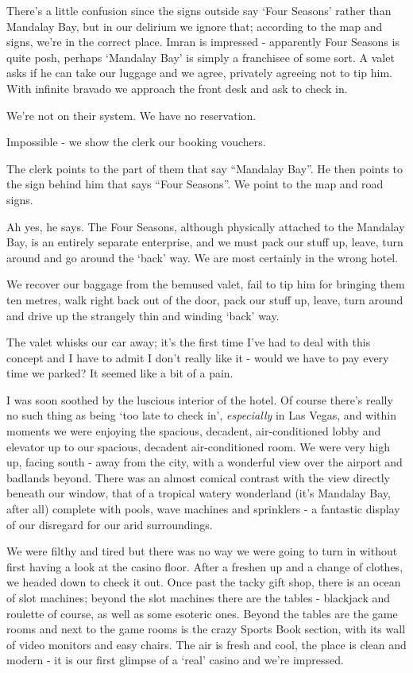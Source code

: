 \documentclass[a5paper,titlepage,draft]{book}
\begin{document}
There's a little confusion since the signs outside say `Four Seasons' rather than Mandalay Bay, but in our delirium we ignore that; according to the map and signs, we're in the correct place.  Imran is impressed - apparently Four Seasons is quite posh, perhaps `Mandalay Bay' is simply a franchisee of some sort.  A valet asks if he can take our luggage and we agree, privately agreeing not to tip him.  With infinite bravado we approach the front desk and ask to check in.

We're not on their system.  We have no reservation.

Impossible - we show the clerk our booking vouchers.

The clerk points to the part of them that say ``Mandalay Bay''.  He then points to the sign behind him that says ``Four Seasons''.  We point to the map and road signs.

Ah yes, he says.  The Four Seasons, although physically attached to the Mandalay Bay, is an entirely separate enterprise, and we must pack our stuff up, leave, turn around and go around the `back' way.  We are most certainly in the wrong hotel.

We recover our baggage from the bemused valet, fail to tip him for bringing them ten metres, walk right back out of the door, pack our stuff up, leave, turn around and drive up the strangely thin and winding `back' way.

The valet whisks our car away; it's the first time I've had to deal with this concept and I have to admit I don't really like it - would we have to pay every time we parked?  It seemed like a bit of a pain.

I was soon soothed by the luscious interior of the hotel.  Of course there's really no such thing as being `too late to check in', \emph{especially} in Las Vegas, and within moments we were enjoying the spacious, decadent, air-conditioned lobby and elevator up to our spacious, decadent air-conditioned room.  We were very high up, facing south - away from the city, with a wonderful view over the airport and badlands beyond.  There was an almost comical contrast with the view directly beneath our window, that of a tropical watery wonderland (it's Mandalay Bay, after all) complete with pools, wave machines and sprinklers - a fantastic display of our disregard for our arid surroundings.

We were filthy and tired but there was no way we were going to turn in without first having a look at the casino floor.  After a freshen up and a change of clothes, we headed down to check it out.  Once past the tacky gift shop, there is an ocean of slot machines; beyond the slot machines there are the tables - blackjack and roulette of course, as well as some esoteric ones.  Beyond the tables are the game rooms and next to the game rooms is the crazy Sports Book section, with its wall of video monitors and easy chairs.  The air is fresh and cool, the place is clean and modern - it is our first glimpse of a `real' casino and we're impressed.
\end{document}
